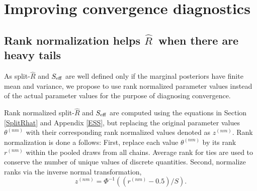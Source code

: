 \documentclass[american,]{article}
\let\rmarkdownfootnote\footnote%
\def\footnote{\protect\rmarkdownfootnote}
\newcommand{\Rhat}{$\widehat{R}$}
\begin{document}
%
%


\hypertarget{improving-convergence-diagnostics}{%
\section{Improving convergence
diagnostics}\label{improving-convergence-diagnostics}}

\hypertarget{rank-normalization}{%
\subsection{Rank normalization helps  \Rhat\ when there are heavy tails}\label{rank-normalization}}

As split-\(\widehat{R}\) and \(S_{\rm eff}\) are well defined
only if the marginal posteriors have finite mean and variance, we
propose to use rank normalized parameter values instead of the actual
parameter values for the purpose of diagnosing convergence.

Rank normalized split-\(\widehat{R}\) and \(S_{\rm eff}\) are
computed using the equations in Section \ref{SplitRhat} and Appendix \ref{ESS}, but
replacing the original parameter values \(\theta^{(nm)}\) with their
corresponding rank normalized values denoted as \(z^{(nm)}\). Rank
normalization is done a follows: First, replace each value
\(\theta^{(nm)}\) by its rank \(r^{(nm)}\) within the pooled draws from all chains.
 Average rank for ties are
used to conserve the number of unique values of discrete quantities.
 Second, normalize ranks via the inverse normal transformation,
\begin{equation}
z^{(nm)} = \Phi^{-1}((r^{(nm)}-0.5)/S).
\end{equation}
\end{document}
